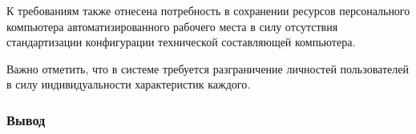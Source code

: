 К требованиям также отнесена потребность в сохранении ресурсов персонального компьютера автоматизированного рабочего места в силу отсутствия стандартизации конфигурации технической составляющей компьютера.

Важно отметить, что в системе требуется разграничение личностей пользователей в силу индивидуальности характеристик каждого.

\subsubsection*{Вывод}






